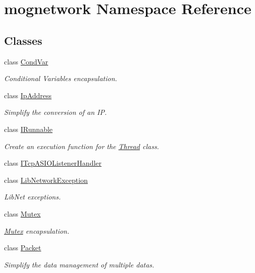 \hypertarget{namespacemognetwork}{\section{mognetwork Namespace Reference}
\label{namespacemognetwork}
}
\subsection*{Classes}
\begin{DoxyCompactItemize}
\item 
class \hyperlink{classmognetwork_1_1_cond_var}{Cond\-Var}
\begin{DoxyCompactList}\small\item\em Conditional Variables encapsulation. \end{DoxyCompactList}\item 
class \hyperlink{classmognetwork_1_1_ip_address}{Ip\-Address}
\begin{DoxyCompactList}\small\item\em Simplify the conversion of an I\-P. \end{DoxyCompactList}\item 
class \hyperlink{classmognetwork_1_1_i_runnable}{I\-Runnable}
\begin{DoxyCompactList}\small\item\em Create an execution function for the \hyperlink{classmognetwork_1_1_thread}{Thread} class. \end{DoxyCompactList}\item 
class \hyperlink{classmognetwork_1_1_i_tcp_a_s_i_o_listener_handler}{I\-Tcp\-A\-S\-I\-O\-Listener\-Handler}
\item 
class \hyperlink{classmognetwork_1_1_lib_network_exception}{Lib\-Network\-Exception}
\begin{DoxyCompactList}\small\item\em Lib\-Net exceptions. \end{DoxyCompactList}\item 
class \hyperlink{classmognetwork_1_1_mutex}{Mutex}
\begin{DoxyCompactList}\small\item\em \hyperlink{classmognetwork_1_1_mutex}{Mutex} encapsulation. \end{DoxyCompactList}\item 
class \hyperlink{classmognetwork_1_1_packet}{Packet}
\begin{DoxyCompactList}\small\item\em Simplify the data management of multiple datas. \end{DoxyCompactList}\item 

\end{DoxyCompactItemize}
